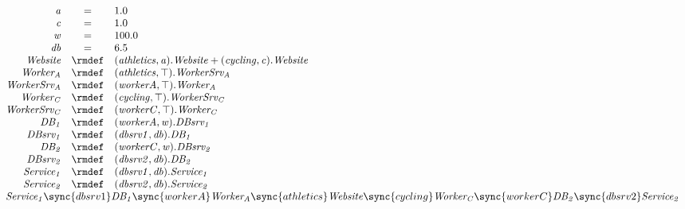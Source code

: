 \begin{displaymath}
	\begin{array}{rcl}
		\mathit{a} & = & 1.0\\
		\mathit{c} & = & 1.0\\
		\mathit{w} & = & 100.0\\
		\mathit{db} & = & 6.5\\
[0.0ex]		\mathit{Website} & \rmdef & (\mathit{athletics},\mathit{a}).\mathit{Website}+(\mathit{cycling},\mathit{c}).\mathit{Website}\\
		\mathit{Worker_A} & \rmdef & (\mathit{athletics},\top).\mathit{WorkerSrv_A}\\
		\mathit{WorkerSrv_A} & \rmdef & (\mathit{workerA},\top).\mathit{Worker_A}\\
		\mathit{Worker_C} & \rmdef & (\mathit{cycling},\top).\mathit{WorkerSrv_C}\\
		\mathit{WorkerSrv_C} & \rmdef & (\mathit{workerC},\top).\mathit{Worker_C}\\
		\mathit{DB_1} & \rmdef & (\mathit{workerA},\mathit{w}).\mathit{DBsrv_1}\\
		\mathit{DBsrv_1} & \rmdef & (\mathit{dbsrv1},\mathit{db}).\mathit{DB_1}\\
		\mathit{DB_2} & \rmdef & (\mathit{workerC},\mathit{w}).\mathit{DBsrv_2}\\
		\mathit{DBsrv_2} & \rmdef & (\mathit{dbsrv2},\mathit{db}).\mathit{DB_2}\\
		\mathit{Service_1} & \rmdef & (\mathit{dbsrv1},\mathit{db}).\mathit{Service_1}\\
		\mathit{Service_2} & \rmdef & (\mathit{dbsrv2},\mathit{db}).\mathit{Service_2}\\
[0.0ex]		\multicolumn{3}{l}{\mathit{Service_1}\sync{dbsrv1}\mathit{DB_1}\sync{workerA}\mathit{Worker_A}\sync{athletics}\mathit{Website}\sync{cycling}\mathit{Worker_C}\sync{workerC}\mathit{DB_2}\sync{dbsrv2}\mathit{Service_2}}\\
[0.0ex]	\end{array}
\end{displaymath}
